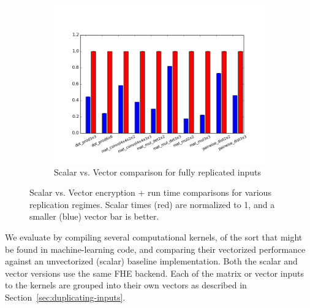 \begin{figure}
     \vspace{-3em}
     
    \begin{subfigure}{\linewidth}
        \includegraphics[width=1\textwidth]{figures/newAspectRatioGraphs/DataReplicatedENC+RUN.png}
            \vspace{-3.5em}
        \caption{Scalar vs. Vector comparison for fully replicated inputs}\label{fig:ml-kernels-repl}
    \end{subfigure}
    \caption{Scalar vs. Vector encryption + run time comparisons for various replication regimes. Scalar times (red) are normalized to 1, and a smaller (blue) vector bar is better.}\label{fig:ml-kernels}
\end{figure}

We evaluate \system by compiling several computational kernels, of the sort that might be found in machine-learning code, and comparing their vectorized performance against an unvectorized (scalar) baseline implementation. Both the scalar and vector versions use the same FHE backend.
Each of the matrix or vector inputs to the kernels are grouped into their own vectors as described in Section~\ref{sec:duplicating-inputs}.

